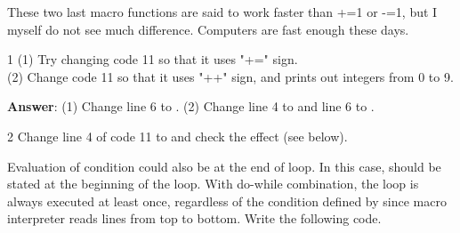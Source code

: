 These two last macro functions are said to work faster than +=1 or -=1, but I myself do not see much difference. Computers are fast enough these days.

\begin{indentexercise}
{1}
(1) Try changing code 11 so that it uses "+=" sign.\\
(2) Change code 11 so that it uses "++" sign, and prints out integers from 0 to 9.\\

\item \textbf{Answer}: (1) Change line 6 to . (2) Change line 4 to  and line 6 to .
\end{indentexercise}

\begin{indentexercise}
{2}
Change line 4 of code 11 to  and check the effect (see below).
\end{indentexercise}

Evaluation of  condition could also be at the end of loop. In this case,  should be stated at the beginning of the loop. With do-while combination, the loop is always executed at least once, regardless of the condition defined by  since macro interpreter reads lines from top to bottom. Write the following code.
